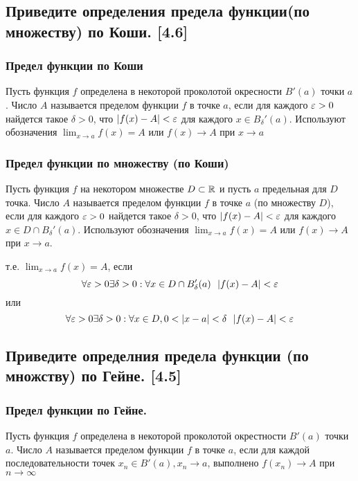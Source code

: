 \documentclass[12pt, a4paper]{article}
\begin{document}
    \subsection{Приведите определения предела функции(по множеству) по Коши. [4.6]}
    \subsubsection{Предел функции по Коши}
    Пусть функция $f$ определена в некоторой проколотой окресности $B'(a)$ точки $a$. Число $A$ называется пределом функции $f$ в точке $a$, если для каждого $\varepsilon > 0$ найдется такое $\delta > 0$, что $|f(x)  - A| < \varepsilon$ для каждого $x \in B_{\delta}'(a)$. Используют обозначения $\lim_{x \to a} f(x) = A$ или $f(x) \to A$ при $x \to a$
    \subsubsection{Предел функции по множеству (по Коши)}
    Пусть функция $f$ на некотором множестве $D \subset \mathbb{R}$ и пусть $a$ предельная для $D$ точка. Число $A$ называется пределом функции $f$ в точке $a$ (по множеству $D$), если для каждого $\varepsilon > 0$ найдется такое $\delta > 0$, что $|f(x) - A| < \varepsilon$ для каждого $x \in D \cap B_{\delta}'(a)$. Используют обозначения $\lim_{x \to a} f(x) = A$ или $f(x) \to A$ при $x \to a$.

    т.е. $\lim_{x \to a} f(x)= A$, если 
    \begin{equation*}
        \forall \varepsilon > 0 \exists \delta > 0 : \forall x \in D \cap B_{\delta}'(a) \ \ |f(x) - A| < \varepsilon
    \end{equation*}
    или
    \begin{equation*}
        \forall \eps > 0 \exists \delta > 0 : \forall x \in D, 0 < |x - a| < \delta \ \ |f(x) - A| < \eps
    \end{equation*}
    \subsection{Приведите определния предела функции (по множству) по Гейне. [4.5]}
    \subsubsection{Предел функции по Гейне.}
    Пусть функция $f$ определена в некоторой проколотой окрестности $B'(a)$ точки $a$. Число $A$ называется пределом функции $f$ в точке $a$, если для каждой последовательности точек $x_n \in B'(a), x_n \to a$, выполнено $f(x_n) \to A$ при $n \to \infty$
\end{document}
